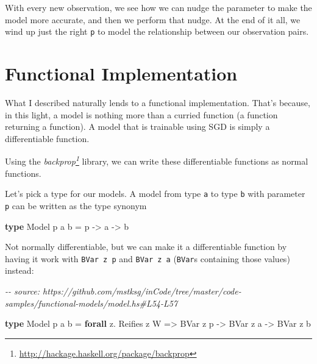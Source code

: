 \documentclass[]{article}
\newenvironment{Shaded}{}{}
\newcommand{\CommentTok}[1]{\textcolor[rgb]{0.38,0.63,0.69}{\textit{#1}}}
\newcommand{\DataTypeTok}[1]{\textcolor[rgb]{0.56,0.13,0.00}{#1}}
\newcommand{\KeywordTok}[1]{\textcolor[rgb]{0.00,0.44,0.13}{\textbf{#1}}}
\newcommand{\NormalTok}[1]{#1}
\newcommand{\OperatorTok}[1]{\textcolor[rgb]{0.40,0.40,0.40}{#1}}
\newcommand{\OtherTok}[1]{\textcolor[rgb]{0.00,0.44,0.13}{#1}}
\renewcommand{\href}[2]{#2\footnote{\url{#1}}}
\begin{document}
With every new observation, we see how we can nudge the parameter to make the
model more accurate, and then we perform that nudge. At the end of it all, we
wind up just the right \texttt{p} to model the relationship between our
observation pairs.

\section{Functional Implementation}\label{functional-implementation}

What I described naturally lends to a functional implementation. That's because,
in this light, a model is nothing more than a curried function (a function
returning a function). A model that is trainable using SGD is simply a
differentiable function.

Using the \emph{\href{http://hackage.haskell.org/package/backprop}{backprop}}
library, we can write these differentiable functions as normal functions.

Let's pick a type for our models. A model from type \texttt{a} to type
\texttt{b} with parameter \texttt{p} can be written as the type synonym

\begin{Shaded}
\begin{Highlighting}[]
\KeywordTok{type} \DataTypeTok{Model}\NormalTok{ p a b }\OtherTok{=}\NormalTok{ p }\OtherTok{{-}\textgreater{}}\NormalTok{ a }\OtherTok{{-}\textgreater{}}\NormalTok{ b}
\end{Highlighting}
\end{Shaded}

Not normally differentiable, but we can make it a differentiable function by
having it work with \texttt{BVar\ z\ p} and \texttt{BVar\ z\ a} (\texttt{BVar}s
containing those values) instead:

\begin{Shaded}
\begin{Highlighting}[]
\CommentTok{{-}{-} source: https://github.com/mstksg/inCode/tree/master/code{-}samples/functional{-}models/model.hs\#L54{-}L57}

\KeywordTok{type} \DataTypeTok{Model}\NormalTok{ p a b }\OtherTok{=} \KeywordTok{forall}\NormalTok{ z}\OperatorTok{.} \DataTypeTok{Reifies}\NormalTok{ z }\DataTypeTok{W}
                \OtherTok{=\textgreater{}} \DataTypeTok{BVar}\NormalTok{ z p}
                \OtherTok{{-}\textgreater{}} \DataTypeTok{BVar}\NormalTok{ z a}
                \OtherTok{{-}\textgreater{}} \DataTypeTok{BVar}\NormalTok{ z b}
\end{Highlighting}
\end{Shaded}
\end{document}
